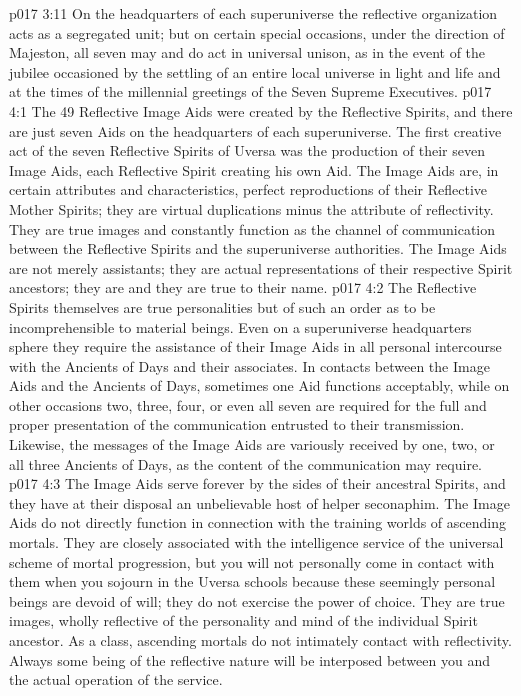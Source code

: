 \vs p017 3:11 On the headquarters of each superuniverse the reflective organization acts as a segregated unit; but on certain special occasions, under the direction of Majeston, all seven may and do act in universal unison, as in the event of the jubilee occasioned by the settling of an entire local universe in light and life and at the times of the millennial greetings of the Seven Supreme Executives.
\vs p017 4:1 The 49 Reflective Image Aids were created by the Reflective Spirits, and there are just seven Aids on the headquarters of each superuniverse. The first creative act of the seven Reflective Spirits of Uversa was the production of their seven Image Aids, each Reflective Spirit creating his own Aid. The Image Aids are, in certain attributes and characteristics, perfect reproductions of their Reflective Mother Spirits; they are virtual duplications minus the attribute of reflectivity. They are true images and constantly function as the channel of communication between the Reflective Spirits and the superuniverse authorities. The Image Aids are not merely assistants; they are actual representations of their respective Spirit ancestors; they are  and they are true to their name.
\vs p017 4:2 The Reflective Spirits themselves are true personalities but of such an order as to be incomprehensible to material beings. Even on a superuniverse headquarters sphere they require the assistance of their Image Aids in all personal intercourse with the Ancients of Days and their associates. In contacts between the Image Aids and the Ancients of Days, sometimes one Aid functions acceptably, while on other occasions two, three, four, or even all seven are required for the full and proper presentation of the communication entrusted to their transmission. Likewise, the messages of the Image Aids are variously received by one, two, or all three Ancients of Days, as the content of the communication may require.
\vs p017 4:3 The Image Aids serve forever by the sides of their ancestral Spirits, and they have at their disposal an unbelievable host of helper seconaphim. The Image Aids do not directly function in connection with the training worlds of ascending mortals. They are closely associated with the intelligence service of the universal scheme of mortal progression, but you will not personally come in contact with them when you sojourn in the Uversa schools because these seemingly personal beings are devoid of will; they do not exercise the power of choice. They are true images, wholly reflective of the personality and mind of the individual Spirit ancestor. As a class, ascending mortals do not intimately contact with reflectivity. Always some being of the reflective nature will be interposed between you and the actual operation of the service.
